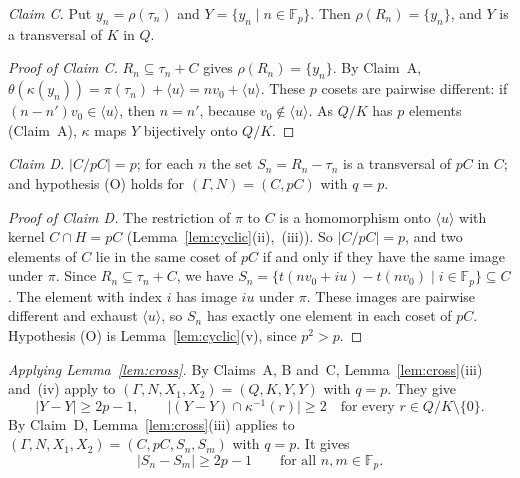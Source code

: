 \documentclass[11pt]{amsart}
\theoremstyle{definition}\newtheorem{definition}[theorem]{Definition}
\theoremstyle{remark}\newtheorem{remark}[theorem]{Remark}
\newcommand{\F}{\mathbb{F}}
\newcommand{\abs}[1]{\lvert #1\rvert}
\newcommand{\gen}[1]{\langle #1\rangle}
\begin{document}
\emph{Claim C.} Put \(y_n=\rho(\tau_n)\) and \(Y=\{y_n\mid n\in\F_p\}\). Then \(\rho(R_n)=\{y_n\}\), and \(Y\) is a transversal of \(K\) in \(Q\).

\begin{proof}[Proof of Claim C]
\(R_n\subseteq\tau_n+C\) gives \(\rho(R_n)=\{y_n\}\).
By Claim~A, \(\theta(\kappa(y_n))=\pi(\tau_n)+\gen{u}=nv_0+\gen{u}\).
These \(p\) cosets are pairwise different: if \((n-n')v_0\in\gen{u}\), then \(n=n'\), because \(v_0\notin\gen{u}\).
As \(Q/K\) has \(p\) elements (Claim~A), \(\kappa\) maps \(Y\) bijectively onto \(Q/K\).
\end{proof}

\emph{Claim D.} \(\abs{C/pC}=p\); for each \(n\) the set \(S_n=R_n-\tau_n\) is a transversal of \(pC\) in \(C\); and hypothesis (O) holds for \((\Gamma,N)=(C,pC)\) with \(q=p\).

\begin{proof}[Proof of Claim D]
The restriction of \(\pi\) to \(C\) is a homomorphism onto \(\gen{u}\) with kernel \(C\cap H=pC\) (Lemma~\ref{lem:cyclic}(ii),~(iii)).
So \(\abs{C/pC}=p\), and two elements of \(C\) lie in the same coset of \(pC\) if and only if they have the same image under \(\pi\).
Since \(R_n\subseteq\tau_n+C\), we have \(S_n=\{t(nv_0+iu)-t(nv_0)\mid i\in\F_p\}\subseteq C\).
The element with index \(i\) has image \(iu\) under \(\pi\).
These images are pairwise different and exhaust \(\gen{u}\), so \(S_n\) has exactly one element in each coset of \(pC\).
Hypothesis (O) is Lemma~\ref{lem:cyclic}(v), since \(p^2>p\).
\end{proof}

\emph{Applying Lemma~\ref{lem:cross}.}
By Claims~A, B and~C, Lemma~\ref{lem:cross}(iii) and~(iv) apply to \((\Gamma,N,X_1,X_2)=(Q,K,Y,Y)\) with \(q=p\).
They give
\begin{equation}\label{eq:YY}
\abs{Y-Y}\ge2p-1,\qquad \abs{(Y-Y)\cap\kappa^{-1}(r)}\ge2\quad\text{for every } r\in Q/K\setminus\{0\}.
\end{equation}
By Claim~D, Lemma~\ref{lem:cross}(iii) applies to \((\Gamma,N,X_1,X_2)=(C,pC,S_n,S_m)\) with \(q=p\).
It gives
\begin{equation}\label{eq:SS}
\abs{S_n-S_m}\ge2p-1\qquad\text{for all } n,m\in\F_p .
\end{equation}
\end{document}
